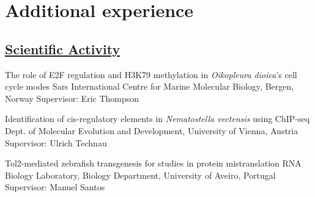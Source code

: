 \documentclass[11pt,a4paper,roman]{moderncv} %
\begin{document}

\section{Additional experience}

    \subsection{\underline{Scientific Activity}}

            {The role of E2F regulation and H3K79 methylation in \textit{Oikopleura dioica}'s cell cycle modes}
            {Sars International Centre for Marine Molecular Biology, Bergen, Norway}{}
            {}
            {Supervisor: Eric Thompson}

            {Identification of cis-regulatory elements in \textit{Nematostella vectensis} using ChIP-seq}
            {Dept. of Molecular Evolution and Development, University of Vienna, Austria}{}
            {}
            {Supervisor: Ulrich Technau}

            {Tol2-mediated zebrafish transgenesis for studies in protein mistranslation}
            {RNA Biology Laboratory, Biology Department, University of Aveiro, Portugal}{}
            {}
            {Supervisor: Manuel Santos}
\end{document}
